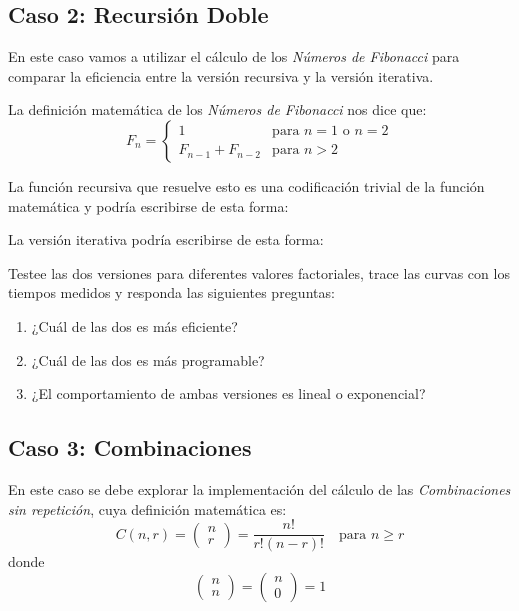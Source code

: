 \subsection*{Caso 2: Recursión Doble}

En este caso vamos a utilizar el cálculo de los \emph{Números de Fibonacci}
para comparar la eficiencia entre la versión recursiva y la versión iterativa.

La definición matemática de los \emph{Números de Fibonacci} nos dice que:
\begin{equation*}
    F_n = \left\{ \begin{array}{ll}
        1                & \text{para } n = 1 \text{ o } n = 2 \\
        F_{n-1} + F_{n-2} & \text{para } n > 2
    \end{array} \right.
\end{equation*}

La función recursiva que resuelve esto es una codificación trivial de la función matemática y podría escribirse de esta forma:



La versión iterativa podría escribirse de esta forma:



Testee las dos versiones para diferentes valores factoriales, trace las curvas con los
tiempos medidos y responda las siguientes preguntas:
\begin{enumerate}
    \item ¿Cuál de las dos es más eficiente?
    \item ¿Cuál de las dos es más programable?
    \item ¿El comportamiento de ambas versiones es lineal o exponencial?
\end{enumerate}


\subsection*{Caso 3: Combinaciones}

En este caso se debe explorar la implementación del cálculo de las
\emph{Combinaciones sin repetición}, cuya definición matemática es:
\begin{equation*}
    C(n, r) = \begin{pmatrix} n \\ r \end{pmatrix} = \frac{n!}{r!(n-r)!} \quad \text{para } n \geq r
\end{equation*}
donde
\begin{equation*}
    \begin{pmatrix}
        n \\ n
    \end{pmatrix} =
    \begin{pmatrix}
        n \\ 0
    \end{pmatrix} = 1    
\end{equation*}

